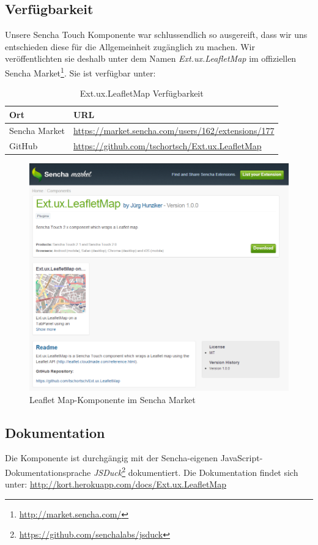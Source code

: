 \subsection{Verfügbarkeit}
Unsere Sencha Touch Komponente war schlussendlich so ausgereift, dass wir uns entschieden diese für die Allgemeinheit zugänglich zu machen.
Wir veröffentlichten sie deshalb unter dem Namen \emph{Ext.ux.LeafletMap} im offiziellen Sencha Market\footnote{\url{http://market.sencha.com/}}.
Sie ist verfügbar unter:

\begin{table}[H]
\centering
\begin{tabular}{|p{0.2\twocelltabwidth}|p{0.8\twocelltabwidth}|}
\hline 
\textbf{Ort} & \textbf{URL} \\ 
\hline 
Sencha Market & \url{https://market.sencha.com/users/162/extensions/177} \\ 
\hline 
GitHub & \url{https://github.com/tschortsch/Ext.ux.LeafletMap} \\ 
\hline 
\end{tabular} 
\caption{Ext.ux.LeafletMap Verfügbarkeit}
\label{leafletmap-availiblity}
\end{table}

\begin{figure}[H]
	\centering
	\includegraphics[scale=0.6]{images/implementation/frontend/leafletmap-sencha-market}
	\caption{Leaflet Map-Komponente im Sencha Market}
	\label{image-leafletmap-sencha-market}
\end{figure}

\subsection{Dokumentation}
Die Komponente ist durchgängig mit der Sencha-eigenen JavaScript-Dokumentationsprache \emph{JSDuck}\footnote{\url{https://github.com/senchalabs/jsduck}} dokumentiert. Die Dokumentation findet sich unter: \url{http://kort.herokuapp.com/docs/Ext.ux.LeafletMap}